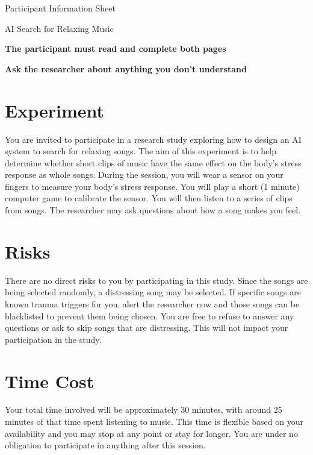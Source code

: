\documentclass[a4paper]{article}
\begin{document}
	\begin{center}
		\setlength{\parskip}{\baselineskip}
		{\Huge Participant Information Sheet}
		
		{\LARGE AI Search for Relaxing Music}
	\end{center}

	\begin{center}
		\textbf{The participant must read and complete both pages}
		
		\textbf{Ask the researcher about anything you don't understand}
	\end{center}
	
	\section{Experiment}
	
	You are invited to participate in a research study exploring how to design an AI system to search for relaxing songs. The aim of this experiment is to help determine whether short clips of music have the same effect on the body's stress response as whole songs. During the session, you will wear a sensor on your fingers to measure your body's stress response. You will play a short (1 minute) computer game to calibrate the sensor. You will then listen to a series of clips from songs. The researcher may ask questions about how a song makes you feel.
	
	\section{Risks}
	
	There are no direct risks to you by participating in this study. Since the songs are being selected randomly, a distressing song may be selected. If specific songs are known trauma triggers for you, alert the researcher now and those songs can be blacklisted to prevent them being chosen. You are free to refuse to answer any questions or ask to skip songs that are distressing. This will not impact your participation in the study.
	
	\section{Time Cost}
	
	Your total time involved will be approximately 30 minutes, with around 25 minutes of that time spent listening to music. This time is flexible based on your availability and you may stop at any point or stay for longer. You are under no obligation to participate in anything after this session.
	
\end{document}
